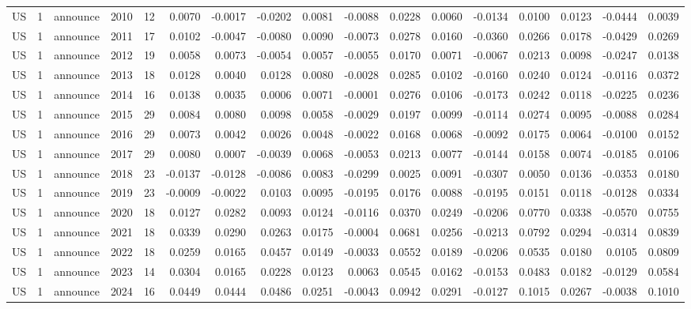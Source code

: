 \begin{tabular}{lrlrrrrrrrrrrrrrr}
US & 1 & announce & 2010 & 12 & 0.0070 & -0.0017 & -0.0202 & 0.0081 & -0.0088 & 0.0228 & 0.0060 & -0.0134 & 0.0100 & 0.0123 & -0.0444 & 0.0039 \\
US & 1 & announce & 2011 & 17 & 0.0102 & -0.0047 & -0.0080 & 0.0090 & -0.0073 & 0.0278 & 0.0160 & -0.0360 & 0.0266 & 0.0178 & -0.0429 & 0.0269 \\
US & 1 & announce & 2012 & 19 & 0.0058 & 0.0073 & -0.0054 & 0.0057 & -0.0055 & 0.0170 & 0.0071 & -0.0067 & 0.0213 & 0.0098 & -0.0247 & 0.0138 \\
US & 1 & announce & 2013 & 18 & 0.0128 & 0.0040 & 0.0128 & 0.0080 & -0.0028 & 0.0285 & 0.0102 & -0.0160 & 0.0240 & 0.0124 & -0.0116 & 0.0372 \\
US & 1 & announce & 2014 & 16 & 0.0138 & 0.0035 & 0.0006 & 0.0071 & -0.0001 & 0.0276 & 0.0106 & -0.0173 & 0.0242 & 0.0118 & -0.0225 & 0.0236 \\
US & 1 & announce & 2015 & 29 & 0.0084 & 0.0080 & 0.0098 & 0.0058 & -0.0029 & 0.0197 & 0.0099 & -0.0114 & 0.0274 & 0.0095 & -0.0088 & 0.0284 \\
US & 1 & announce & 2016 & 29 & 0.0073 & 0.0042 & 0.0026 & 0.0048 & -0.0022 & 0.0168 & 0.0068 & -0.0092 & 0.0175 & 0.0064 & -0.0100 & 0.0152 \\
US & 1 & announce & 2017 & 29 & 0.0080 & 0.0007 & -0.0039 & 0.0068 & -0.0053 & 0.0213 & 0.0077 & -0.0144 & 0.0158 & 0.0074 & -0.0185 & 0.0106 \\
US & 1 & announce & 2018 & 23 & -0.0137 & -0.0128 & -0.0086 & 0.0083 & -0.0299 & 0.0025 & 0.0091 & -0.0307 & 0.0050 & 0.0136 & -0.0353 & 0.0180 \\
US & 1 & announce & 2019 & 23 & -0.0009 & -0.0022 & 0.0103 & 0.0095 & -0.0195 & 0.0176 & 0.0088 & -0.0195 & 0.0151 & 0.0118 & -0.0128 & 0.0334 \\
US & 1 & announce & 2020 & 18 & 0.0127 & 0.0282 & 0.0093 & 0.0124 & -0.0116 & 0.0370 & 0.0249 & -0.0206 & 0.0770 & 0.0338 & -0.0570 & 0.0755 \\
US & 1 & announce & 2021 & 18 & 0.0339 & 0.0290 & 0.0263 & 0.0175 & -0.0004 & 0.0681 & 0.0256 & -0.0213 & 0.0792 & 0.0294 & -0.0314 & 0.0839 \\
US & 1 & announce & 2022 & 18 & 0.0259 & 0.0165 & 0.0457 & 0.0149 & -0.0033 & 0.0552 & 0.0189 & -0.0206 & 0.0535 & 0.0180 & 0.0105 & 0.0809 \\
US & 1 & announce & 2023 & 14 & 0.0304 & 0.0165 & 0.0228 & 0.0123 & 0.0063 & 0.0545 & 0.0162 & -0.0153 & 0.0483 & 0.0182 & -0.0129 & 0.0584 \\
US & 1 & announce & 2024 & 16 & 0.0449 & 0.0444 & 0.0486 & 0.0251 & -0.0043 & 0.0942 & 0.0291 & -0.0127 & 0.1015 & 0.0267 & -0.0038 & 0.1010 \\

\end{tabular}
